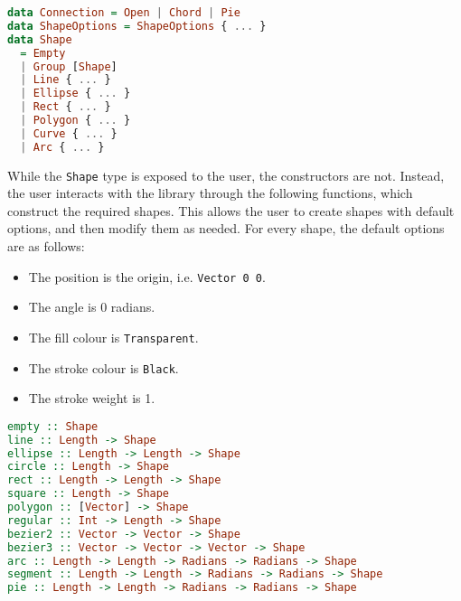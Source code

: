 \documentclass[../main.tex]{subfiles}
\begin{document}
                \begin{lstlisting}[language=Haskell, label={lst:shape}, morekeywords={Connection, Open, Chord, 
                    Pie, ShapeOptions, Vector, Radians, Color, Length, Shape, Empty, Group, Line, Ellipse, Rect, 
                    Polygon, Curve, Arc}, caption={The Shape type definition.}]
data Connection = Open | Chord | Pie
data ShapeOptions = ShapeOptions { ... }
data Shape
  = Empty
  | Group [Shape]
  | Line { ... }
  | Ellipse { ... }
  | Rect { ... }
  | Polygon { ... }
  | Curve { ... }
  | Arc { ... }\end{lstlisting}

                While the \verb|Shape| type is exposed to the user, the constructors are not.
                Instead, the user interacts with the library through the following functions,
                    which construct the required shapes.
                This allows the user to create shapes with default options, and then modify
                    them as needed.
                For every shape, the default options are as follows:
                \begin{itemize}
                    \item The position is the origin, i.e. \verb|Vector 0 0|.
                    \item The angle is 0 radians.
                    \item The fill colour is \verb|Transparent|.
                    \item The stroke colour is \verb|Black|.
                    \item The stroke weight is 1.
                \end{itemize}

                \begin{lstlisting}[language=Haskell, label={lst:shapes}, morekeywords={Shape, Length, Vector, Radians,
                    Color, ShapeOptions, Connection, Open, Chord, Pie}, caption={The functions to create shapes.}]
empty :: Shape
line :: Length -> Shape
ellipse :: Length -> Length -> Shape
circle :: Length -> Shape
rect :: Length -> Length -> Shape
square :: Length -> Shape
polygon :: [Vector] -> Shape
regular :: Int -> Length -> Shape
bezier2 :: Vector -> Vector -> Shape
bezier3 :: Vector -> Vector -> Vector -> Shape
arc :: Length -> Length -> Radians -> Radians -> Shape
segment :: Length -> Length -> Radians -> Radians -> Shape
pie :: Length -> Length -> Radians -> Radians -> Shape\end{lstlisting}
\end{document}
